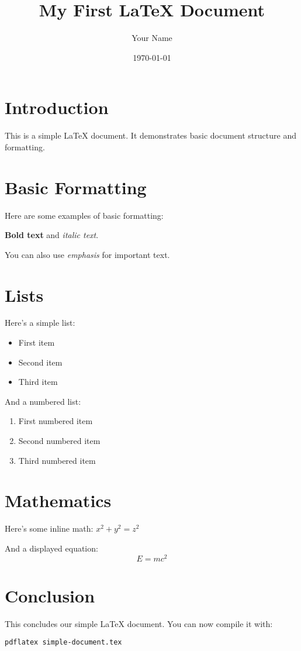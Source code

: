\documentclass{article}
\title{My First LaTeX Document}
\author{Your Name}
\date{\today}
\begin{document}
\maketitle

\section{Introduction}
This is a simple LaTeX document. It demonstrates basic document structure and formatting.

\section{Basic Formatting}
Here are some examples of basic formatting:

\textbf{Bold text} and \textit{italic text}.

You can also use \emph{emphasis} for important text.

\section{Lists}
Here's a simple list:
\begin{itemize}
    \item First item
    \item Second item
    \item Third item
\end{itemize}

And a numbered list:
\begin{enumerate}
    \item First numbered item
    \item Second numbered item
    \item Third numbered item
\end{enumerate}

\section{Mathematics}
Here's some inline math: $x^2 + y^2 = z^2$

And a displayed equation:
\[
E = mc^2
\]

\section{Conclusion}
This concludes our simple LaTeX document. You can now compile it with:
\begin{verbatim}
pdflatex simple-document.tex
\end{verbatim}
\end{document}
